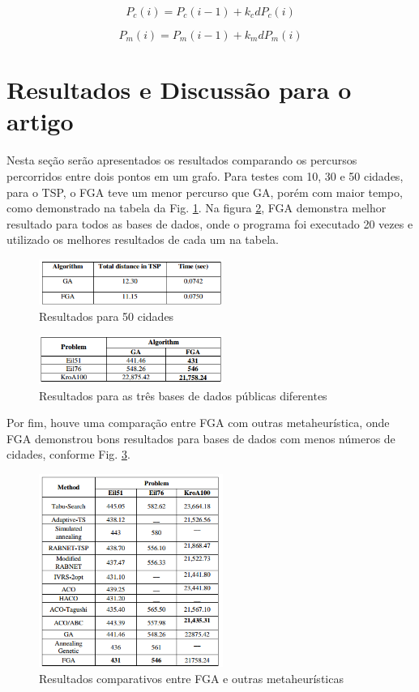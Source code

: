 \documentclass[conference]{IEEEtran}
\begin{document}
\begin{equation}
\label{eq:P_c}
    P_c(i) = P_c(i-1) + k_c dP_c(i) 
\end{equation}

\begin{equation}
\label{eq:P_m}
    P_m(i) = P_m(i-1) + k_m dP_m(i) 
\end{equation}

\section{Resultados e Discussão para o artigo \cite{fga}}
\label{sec:results}
Nesta seção serão apresentados os resultados comparando os percursos percorridos entre dois pontos em um grafo. Para testes com 10, 30 e 50 cidades, para o TSP, o FGA teve um menor percurso que GA, porém com maior tempo, como demonstrado na tabela da Fig. \ref{img:fuzzy_fig5}. Na figura \ref{img:fuzzy_fig6}, FGA demonstra melhor resultado para todos as bases de dados, onde o programa foi executado 20 vezes e utilizado os melhores resultados de cada um na tabela.

\begin{figure}[ht]
\centering
\includegraphics[width=6cm]{fuzzy_fig5.png}
\caption{\label{img:fuzzy_fig5} Resultados para 50 cidades} 
\end{figure}

\begin{figure}[ht]
\centering
\includegraphics[width=6cm]{fuzzy_fig6.png}
\caption{\label{img:fuzzy_fig6} Resultados para as três bases de dados públicas diferentes} 
\end{figure}

Por fim, houve uma comparação entre FGA com outras metaheurística, onde FGA demonstrou bons resultados para bases de dados com menos números de cidades, conforme Fig. \ref{img:fuzzy_fig7}.
\begin{figure}[ht]
\centering
\includegraphics[width=6cm]{fuzzy_fig7.png}
\caption{\label{img:fuzzy_fig7} Resultados comparativos entre FGA e outras metaheurísticas} 
\end{figure}
\end{document}
